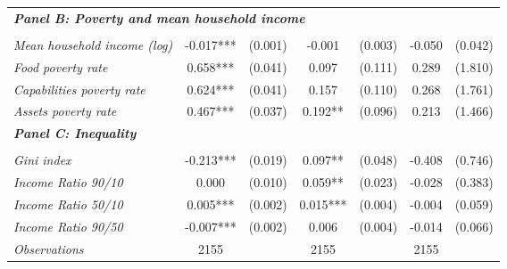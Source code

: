 \begin{tabular}{lcccccc}
\midrule

\multicolumn{7}{l}{\textit{\bf Panel  B: Poverty and mean household income}}   \\
\\
\textit{Mean household income (log)}  &  -0.017***  
					   & (0.001) 
					   &  -0.001  
					   & (0.003)
					   &  -0.050  
					   &  (0.042) \\[0.2cm]
					   
\textit{Food poverty rate}  &  0.658***  
					   & (0.041) 
					   &  0.097  
					   & (0.111)
					   &  0.289  
					   &  (1.810) \\[0.2cm]
					   
\textit{Capabilities poverty rate}  &  0.624***  
					   & (0.041) 
					   &  0.157  
					   & (0.110)
					   &  0.268  
					   &  (1.761) \\[0.2cm]
					   
\textit{Assets poverty rate}  &  0.467***  
					   & (0.037) 
					   &  0.192**  
					   & (0.096)
					   &  0.213  
					   &  (1.466) \\[0.2cm]

\midrule                                                                                      
\multicolumn{7}{l}{\textit{\bf Panel  C: Inequality}}   \\ 
\\
\textit{Gini index}  &  -0.213***  
					   & (0.019) 
					   &  0.097**  
					   & (0.048)
					   &  -0.408  
					   &  (0.746) \\ [0.2cm]
					   
\textit{Income Ratio 90/10}  &  0.000  
					   & (0.010) 
					   &  0.059**  
					   & (0.023)
					   &  -0.028  
					   &  (0.383) \\ [0.2cm]
					   
\textit{Income Ratio 50/10}  &  0.005***  
					   & (0.002) 
					   &  0.015***  
					   & (0.004)
					   &  -0.004  
					   &  (0.059) \\ [0.2cm]
					   
\textit{Income Ratio 90/50}  &  -0.007***  
					   & (0.002) 
					   &  0.006  
					   & (0.004)
					   &  -0.014  
					   &  (0.066) \\ [0.2cm]
					   

\midrule

\textit{Observations} 	  &   2155  & & 2155  & &   2155  &  \\ [0.2cm]

\bottomrule

\end{tabular}%


